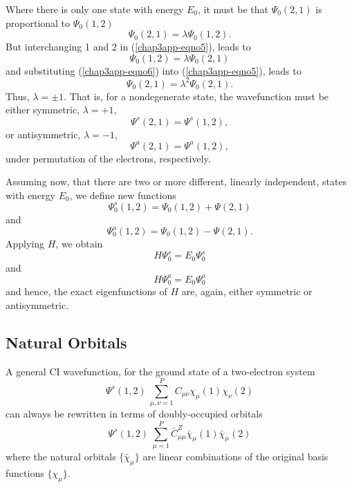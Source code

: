 Where there is only one state with energy $E_0$, it must be that 
$\Psi_0(2, 1)$  is proportional to $\Psi_0(1, 2)$
\begin{equation}
\Psi_0(2, 1) = \lambda \Psi_0(1, 2).
\label{chap3app-eqno5}
\end{equation}
But interchanging 1 and 2 in (\ref{chap3app-eqno5}), leads to
\begin{equation}
\Psi_0(1, 2) = \lambda \Psi_0(2, 1)
\label{chap3app-eqno6}
\end{equation}
and substituting (\ref{chap3app-eqno6}) into (\ref{chap3app-eqno5}), leads
to
\begin{equation}
\Psi_0(2, 1) = \lambda^2 \Psi_0(2, 1).
\end{equation}
Thus, $\lambda = \pm 1$. That is, for a nondegenerate state, the 
wavefunction must be either symmetric, $\lambda = +1$,
\begin{equation}
\Psi^s (2,1) = \Psi^s (1,2) ,
\end{equation}
or antisymmetric, $\lambda = -1$,
\begin{equation}
\Psi^a (2,1) = \Psi^a (1,2),
\end{equation}
under permutation of the electrons, respectively.

Assuming now, that there are two or more different, linearly independent, 
states with energy $E_0$, we define new functions
\begin{equation}
\Psi^s_0 (1,2) = \Psi_0 (1,2) + \Psi (2,1)
\end{equation}
and
\begin{equation}
\Psi^a_0 (1,2) = \Psi_0 (1,2) - \Psi (2,1).
\end{equation}
Applying $H$, we obtain
\begin{equation}
H \Psi^s_0 = E_0 \Psi^s_0
\end{equation}
and
\begin{equation}
H \Psi^a_0 = E_0 \Psi^a_0
\end{equation}
and hence, the exact eigenfunctions of $H$ are, again, either 
symmetric or antisymmetric.

\subsection{Natural Orbitals}
\label{chap3-app-b}

A general CI wavefunction, for the ground state of a 
two-electron system
\begin{equation}
\Psi^s (1,2)  \ \sum^{P}_{\mu , \nu=1} C_{\mu \nu} \chi_{\mu} (1) 
\chi_{\nu} (2)
\label{chap3app-eqno7}
\end{equation}
can always be rewritten in terms of doubly-occupied orbitals
\begin{equation}
\Psi^s (1,2)  \ \sum^{P}_{\mu =1} {\bar C}^Z_{\mu \mu} {\bar \chi}_{\mu} (1) 
{\bar \chi}_{\mu} (2)
\label{chap3app-eqno8}
\end{equation}
where the natural orbitals $\{ {\bar \chi}_{\mu}\}$ are linear combinations 
of the original basis functions $\{ \chi_{\mu} \}$.

